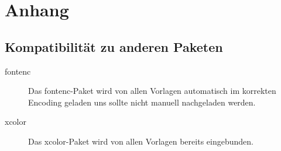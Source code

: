 \chapter{Anhang}

\section{Kompatibilität zu anderen Paketen}

\begin{description}
  \item[fontenc]
    Das fontenc-Paket wird von allen Vorlagen automatisch im korrekten Encoding
    geladen uns sollte nicht manuell nachgeladen werden.
  \item[xcolor]
    Das xcolor-Paket wird von allen Vorlagen bereits eingebunden.
\end{description}
